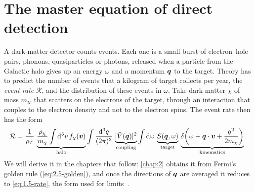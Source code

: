 \section{The master equation of direct detection}\label{sec:1.1}

A dark-matter detector counts events. Each one is a small burst of electron--hole pairs, phonons, quasiparticles or photons, released when a particle from the Galactic halo gives up an energy $\omega$ and a momentum $\bm{q}$ to the target. Theory has to predict the number of events that a kilogram of target collects per year, the \emph{event rate} $\mathcal{R}$, and the distribution of these events in $\omega$. Take dark matter $\chi$ of mass $m_{\chi}$ that scatters on the electrons of the target, through an interaction that couples to the electron density and not to the electron spins. The event rate then has the form
\begin{equation}
  \mathcal{R} = \frac{1}{\rho_T}\,\underbrace{\frac{\rho_\chi}{m_{\chi}}\int\mathrm{d}^3v\,f_\chi(\bm{v})}_{\text{halo}}\int\frac{\mathrm{d}^3q}{(2\pi)^3}\,\underbrace{|\tilde V(\bm{q})|^2}_{\text{coupling}}\int\mathrm{d}\omega\,\underbrace{S(\bm{q},\omega)}_{\text{target}}\,\underbrace{\delta\!\left(\omega - \bm{q}\cdot\bm{v} + \frac{q^2}{2m_{\chi}}\right)}_{\text{kinematics}}.
  \label{eq:1.1-rate}
\end{equation}
We will derive it in the chapters that follow: \cref{chap:2} obtains it from Fermi's golden rule (\cref{eq:2.5-golden}), and once the directions of $\bm{q}$ are averaged it reduces to \cref{eq:1.5-rate}, the form used for limits~\cite{kahn2022searches}.

